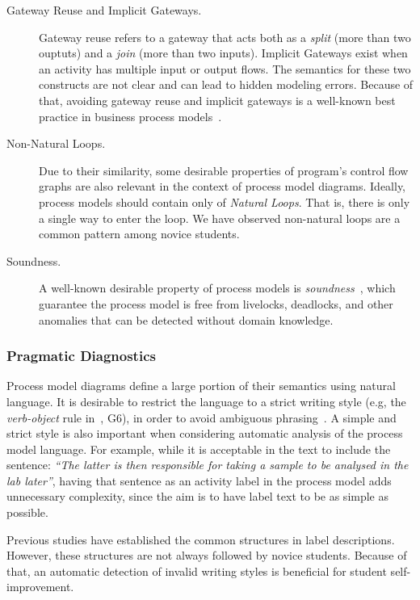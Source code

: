 \begin{description}
\item[Gateway Reuse and Implicit Gateways.]{Gateway reuse re\-fers to a gateway
    that acts both as a \emph{split} (more than two ouptuts) and a \emph{join}
    (more than two inputs). Implicit Gateways exist when an activity has
    multiple input or output flows. The semantics for these two constructs are not
    clear and can lead to hidden modeling errors. Because of that, avoiding gateway reuse and implicit
    gateways is a well-known best practice in business process models~\cite{MendlingRA10}.}
\item[Non-Natural Loops.]{Due to their similarity, some desirable properties of
    program's control flow graphs are also relevant in the context of process
    model diagrams. Ideally, process models should contain only of \emph{Natural
      Loops}. That is, there is only a single way to enter the loop. 
      We have observed non-natural loops are a common pattern among novice students.}
\item[Soundness.]{A well-known desirable property of process models is {\em soundness}~\cite{AalstHHSVVW11}, which guarantee the process model is free from livelocks, deadlocks, and other anomalies that can be detected without domain knowledge.}
\end{description}

\subsubsection{Pragmatic Diagnostics}

Process model diagrams define a large portion of their semantics using natural
language. It is desirable to restrict the language to a strict writing style (e.g, the {\em verb-object} rule in~\cite{MendlingRA10}, G6), in
order to avoid ambiguous phrasing~\cite{Leopold0M12}. A simple and strict style is also important
when considering automatic analysis of the process model language. For example, 
while it is acceptable in the text to include the sentence: \emph{``The latter is then
responsible for taking a sample to be analysed in the lab later''}, having that 
sentence as an activity label in the process model adds unnecessary complexity,
since the aim is to have label text to be as simple as possible.

Previous studies \cite{mendling2010activity, Leopold0M12, leopold2013detection} have
established the common structures in label descriptions. However, these
structures are not always followed by novice students. Because of that, an
automatic detection of invalid writing styles is beneficial for student
self-improvement.

